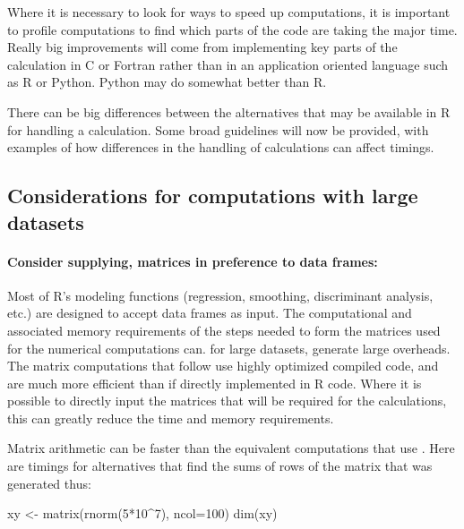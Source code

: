 Where
it is necessary to look for ways to speed up computations, it is
important to profile computations to find which parts of the code
are taking the major time.  Really big improvements will come from
implementing key parts of the calculation in C or Fortran rather than
in an application oriented language such as R or Python.  Python may
do somewhat better than R.

There can be big differences between the alternatives that may be
available in R for handling a calculation. Some broad guidelines will
now be provided, with examples of how differences in the handling of
calculations can affect timings.

\subsection{Considerations for computations with large datasets}

\paragraph{Consider supplying, matrices in preference to data frames:}

Most of R's modeling functions (regression, smoothing, discriminant
analysis, etc.) are designed to accept data frames as input. The
computational and associated memory requirements of the steps
needed to form the matrices used for the numerical computations
can. for large datasets, generate large overheads.  The matrix 
computations that follow use highly optimized compiled code, 
and are much more efficient than if directly implemented in R code.
Where it is possible to directly input the matrices that will be
required for the calculations, this can greatly reduce the time
and memory requirements.

Matrix arithmetic can be faster than the equivalent computations
that use . Here are timings for alternatives that
find the sums of rows of the matrix  that was generated thus:
\begin{Schunk}
\begin{Sinput}
xy <- matrix(rnorm(5*10^7), ncol=100)
dim(xy)
\end{Sinput}
\end{Schunk}

